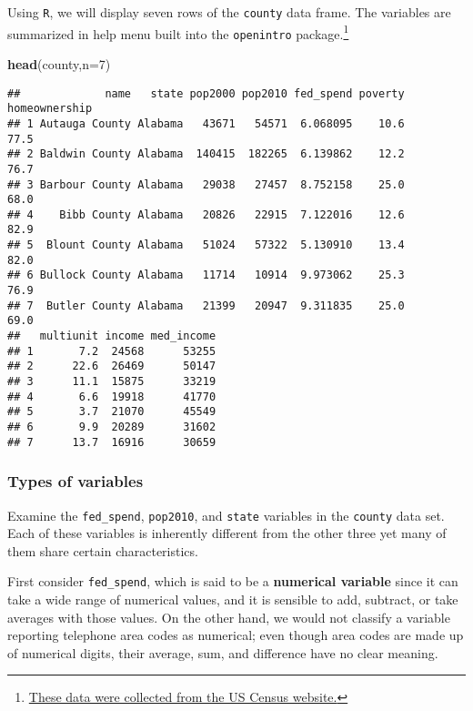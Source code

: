 \documentclass[
]{article}
\newenvironment{Shaded}{\begin{snugshade}}{\end{snugshade}}
\newcommand{\DataTypeTok}[1]{\textcolor[rgb]{0.13,0.29,0.53}{#1}}
\newcommand{\DecValTok}[1]{\textcolor[rgb]{0.00,0.00,0.81}{#1}}
\newcommand{\KeywordTok}[1]{\textcolor[rgb]{0.13,0.29,0.53}{\textbf{#1}}}
\newcommand{\NormalTok}[1]{#1}
\begin{document}
Using \texttt{R}, we will display seven rows of the \texttt{county} data
frame. The variables are summarized in help menu built into the
\texttt{openintro} package.\footnote{\href{http://quickfacts.census.gov/qfd/index.html}{These
  data were collected from the US Census website.}}

\begin{Shaded}
\begin{Highlighting}[]
\KeywordTok{head}\NormalTok{(county,}\DataTypeTok{n=}\DecValTok{7}\NormalTok{)}
\end{Highlighting}
\end{Shaded}

\begin{verbatim}
##             name   state pop2000 pop2010 fed_spend poverty homeownership
## 1 Autauga County Alabama   43671   54571  6.068095    10.6          77.5
## 2 Baldwin County Alabama  140415  182265  6.139862    12.2          76.7
## 3 Barbour County Alabama   29038   27457  8.752158    25.0          68.0
## 4    Bibb County Alabama   20826   22915  7.122016    12.6          82.9
## 5  Blount County Alabama   51024   57322  5.130910    13.4          82.0
## 6 Bullock County Alabama   11714   10914  9.973062    25.3          76.9
## 7  Butler County Alabama   21399   20947  9.311835    25.0          69.0
##   multiunit income med_income
## 1       7.2  24568      53255
## 2      22.6  26469      50147
## 3      11.1  15875      33219
## 4       6.6  19918      41770
## 5       3.7  21070      45549
## 6       9.9  20289      31602
## 7      13.7  16916      30659
\end{verbatim}

\hypertarget{types-of-variables}{%
\subsubsection{Types of variables}\label{types-of-variables}}

Examine the \texttt{fed\_spend}, \texttt{pop2010}, and \texttt{state}
variables in the \texttt{county} data set. Each of these variables is
inherently different from the other three yet many of them share certain
characteristics.

First consider \texttt{fed\_spend}, which is said to be a
\textbf{numerical variable} since it can take a wide range of numerical
values, and it is sensible to add, subtract, or take averages with those
values. On the other hand, we would not classify a variable reporting
telephone area codes as numerical; even though area codes are made up of
numerical digits, their average, sum, and difference have no clear
meaning.
\end{document}
